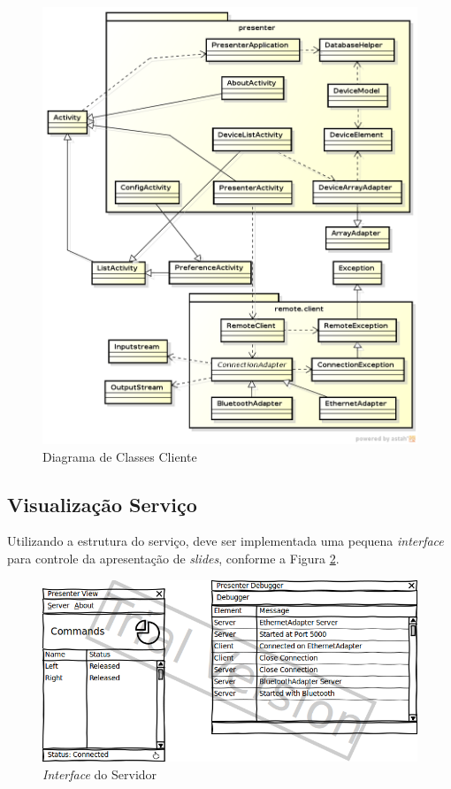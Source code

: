 \documentclass{article}
\begin{document}
\begin{figure}
    \centering{}
    \includegraphics[width=\textwidth]{presenter-client.png}
    \caption{Diagrama de Classes Cliente}
    \label{fig:client}
\end{figure}

\subsection{Visualização Serviço}

Utilizando a estrutura do serviço, deve ser implementada uma pequena
\emph{interface} para controle da apresentação de \emph{slides}, conforme a
Figura \ref{fig:server-view}.

\begin{figure}
    \centering{}
    \includegraphics[scale=0.55]{presenter-server-view.png}
    \caption{\emph{Interface} do Servidor}
    \label{fig:server-view}
\end{figure}
\end{document}
